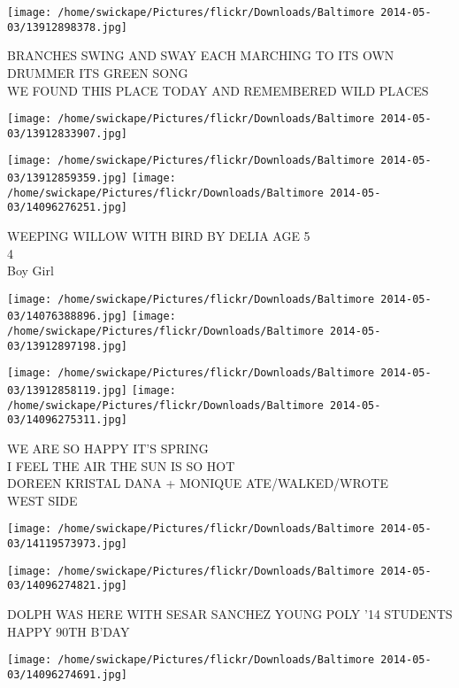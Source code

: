 \documentclass[10pt,letterpaper]{article}
\begin{document}
\vspace{0.25in}
\texttt{[image: /home/swickape/Pictures/flickr/Downloads/Baltimore 2014-05-03/13912898378.jpg]}

BRANCHES SWING AND SWAY EACH MARCHING TO ITS OWN DRUMMER ITS GREEN SONG\\
WE FOUND THIS PLACE TODAY AND REMEMBERED WILD PLACES
\pagebreak

\texttt{[image: /home/swickape/Pictures/flickr/Downloads/Baltimore 2014-05-03/13912833907.jpg]}

\vspace{0.25in}
\texttt{[image: /home/swickape/Pictures/flickr/Downloads/Baltimore 2014-05-03/13912859359.jpg]}
\texttt{[image: /home/swickape/Pictures/flickr/Downloads/Baltimore 2014-05-03/14096276251.jpg]}

WEEPING WILLOW WITH BIRD BY DELIA AGE 5\\
4\\
Boy Girl
\pagebreak

\texttt{[image: /home/swickape/Pictures/flickr/Downloads/Baltimore 2014-05-03/14076388896.jpg]}
\texttt{[image: /home/swickape/Pictures/flickr/Downloads/Baltimore 2014-05-03/13912897198.jpg]}

\texttt{[image: /home/swickape/Pictures/flickr/Downloads/Baltimore 2014-05-03/13912858119.jpg]}
\texttt{[image: /home/swickape/Pictures/flickr/Downloads/Baltimore 2014-05-03/14096275311.jpg]}

WE ARE SO HAPPY IT'S SPRING\\
I FEEL THE AIR THE SUN IS SO HOT\\
DOREEN KRISTAL DANA + MONIQUE ATE/WALKED/WROTE\\
WEST SIDE
\pagebreak

\texttt{[image: /home/swickape/Pictures/flickr/Downloads/Baltimore 2014-05-03/14119573973.jpg]}

\vspace{0.25in}
\texttt{[image: /home/swickape/Pictures/flickr/Downloads/Baltimore 2014-05-03/14096274821.jpg]}

DOLPH WAS HERE WITH SESAR SANCHEZ YOUNG POLY '14 STUDENTS\\
HAPPY 90TH B'DAY
\pagebreak

\texttt{[image: /home/swickape/Pictures/flickr/Downloads/Baltimore 2014-05-03/14096274691.jpg]}
\end{document}

